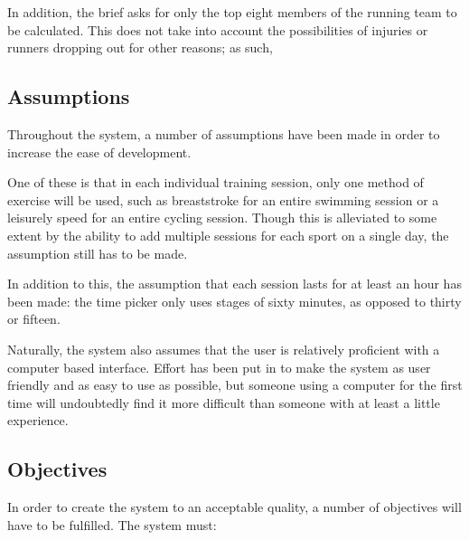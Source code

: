 \documentclass{article}[12pt,a4paper]
\begin{document}
In addition, the brief asks for only the top eight members of the running team to be calculated. This does not take into account the possibilities of injuries or runners dropping out for other reasons; as such, 

\subsection{Assumptions}
Throughout the system, a number of assumptions have been made in order to increase the ease of development. 

One of these is that in each individual training session, only one method of exercise will be used, such as breaststroke for an entire swimming session or a leisurely speed for an entire cycling session. Though this is alleviated to some extent by the ability to add multiple sessions for each sport on a single day, the assumption still has to be made. 

In addition to this, the assumption that each session lasts for at least an hour has been made: the time picker only uses stages of sixty minutes, as opposed to thirty or fifteen.

Naturally, the system also assumes that the user is relatively proficient with a computer based interface. Effort has been put in to make the system as user friendly and as easy to use as possible, but someone using a computer for the first time will undoubtedly find it more difficult than someone with at least a little experience.

\subsection{Objectives}
In order to create the system to an acceptable quality, a number of objectives will have to be fulfilled. The system must:
\end{document}
